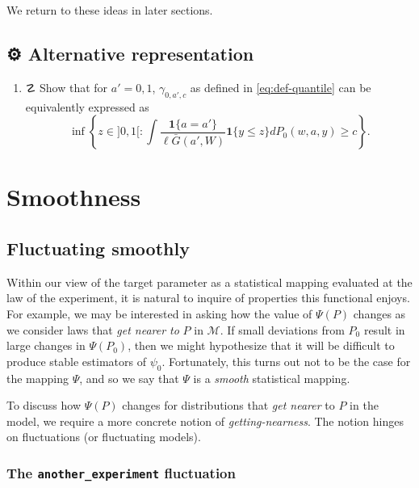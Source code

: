 \documentclass[11pt,openright,twoside]{book}
\providecommand{\tightlist}{%
  \setlength{\itemsep}{0pt}\setlength{\parskip}{0pt}}
\newcommand{\gear}{\usebox{\gearbox}\;}
\DeclareRobustCommand{\stixdanger}{%
  {\usefont{U}{stixbbit}{m}{it}\symbol{"F6}}%
}
\newcommand{\calM}{\mathcal{M}}
\newcommand{\Gbar}{\bar{G}}
\newcommand{\one}{\textbf{1}}
\theoremstyle{definition}
\theoremstyle{definition}
\theoremstyle{definition}
\theoremstyle{remark}
\begin{document}
We return to these ideas in later sections.

\hypertarget{exo-alternative-parameter-third-pass}{%
\section{\texorpdfstring{⚙ \gear Alternative representation}{⚙ Alternative representation}}\label{exo-alternative-parameter-third-pass}}

\begin{enumerate}
\def\labelenumi{\arabic{enumi}.}
\tightlist
\item
  ☡ \stixdanger{} Show that for \(a' = 0,1\), \(\gamma_{0,a',c}\) as defined in
  \eqref{eq:def-quantile} can be equivalently expressed as \begin{equation*}\inf
  \left\{z \in ]0,1[  : \int \frac{\one\{a =  a'\}}{\ell\Gbar(a',W)} \one\{y \le
  z\} dP_0(w,a,y) \ge c \right\}.\end{equation*}
\end{enumerate}

\hypertarget{smooth}{%
\chapter{Smoothness}\label{smooth}}

\hypertarget{smooth-first-pass}{%
\section{Fluctuating smoothly}\label{smooth-first-pass}}

Within our view of the target parameter as a statistical mapping evaluated at
the law of the experiment, it is natural to inquire of properties this
functional enjoys. For example, we may be interested in asking how the value
of \(\Psi(P)\) changes as we consider laws that \emph{get nearer to} \(P\) in \(\calM\).
If small deviations from \(P_0\) result in large changes in \(\Psi(P_0)\), then we
might hypothesize that it will be difficult to produce stable estimators of
\(\psi_0\). Fortunately, this turns out not to be the case for the mapping
\(\Psi\), and so we say that \(\Psi\) is a \emph{smooth} statistical mapping.

To discuss how \(\Psi(P)\) changes for distributions that \emph{get nearer} to \(P\) in
the model, we require a more concrete notion of \emph{getting-nearness}. The notion
hinges on fluctuations (or fluctuating models).

\hypertarget{fluctuations}{%
\subsection{\texorpdfstring{The \texttt{another\_experiment} fluctuation}{The another\_experiment fluctuation}}\label{fluctuations}}
\end{document}
